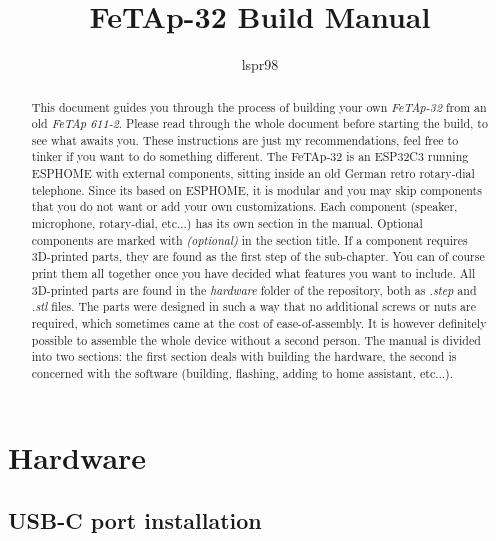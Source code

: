 \documentclass[]{article}
\title{FeTAp-32 Build Manual}
\author{lspr98}
\begin{document}
\maketitle

\begin{abstract}
	This document guides you through the process of building your own \textit{FeTAp-32} from an old \textit{FeTAp 611-2}. Please read through the whole document before starting the build, to see what awaits you. These instructions are just my recommendations, feel free to tinker if you want to do something different.
	\newline
	\newline
	The FeTAp-32 is an ESP32C3 running ESPHOME with external components, sitting inside an old German retro rotary-dial telephone. Since its based on ESPHOME, it is modular and you may skip components that you do not want or add your own customizations. Each component (speaker, microphone, rotary-dial, etc...) has its own section in the manual. Optional components are marked with \textit{(optional)} in the section title.
	\newline
	\newline
	If a component requires 3D-printed parts, they are found as the first step of the sub-chapter. You can of course print them all together once you have decided what features you want to include. All 3D-printed parts are found in the \textit{hardware} folder of the repository, both as \textit{.step} and \textit{.stl} files. The parts were designed in such a way that no additional screws or nuts are required, which sometimes came at the cost of ease-of-assembly. It is however definitely possible to assemble the whole device without a second person.
	\newline
	\newline
	The manual is divided into two sections: the first section deals with building the hardware, the second is concerned with the software (building, flashing, adding to home assistant, etc...).
\end{abstract}

\tableofcontents

\section{Hardware}
\subsection{USB-C port installation}
\end{document}
